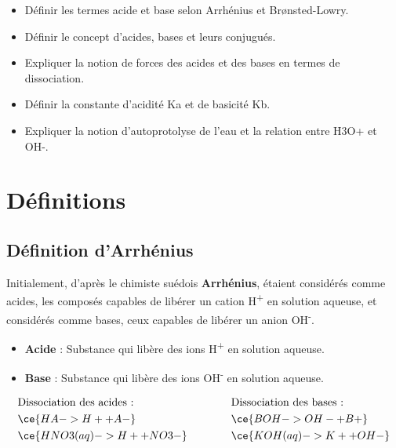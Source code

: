 \documentclass[
  11pt,
  a4paper,
  openany]{book}
\providecommand{\tightlist}{%
  \setlength{\itemsep}{0pt}\setlength{\parskip}{0pt}}
\begin{document}
\begin{objectives}

\begin{itemize}
\tightlist
\item
  Définir les termes acide et base selon Arrhénius et Brønsted-Lowry.
\item
  Définir le concept d'acides, bases et leurs conjugués.
\item
  Expliquer la notion de forces des acides et des bases en termes de dissociation.
\item
  Définir la constante d'acidité Ka et de basicité Kb.
\item
  Expliquer la notion d'autoprotolyse de l'eau et la relation entre \textbar H3O+\textbar{} et \textbar OH-\textbar.
\end{itemize}

\end{objectives}

\section{Définitions}\label{duxe9finitions-1}

\subsection{Définition d'Arrhénius}\label{duxe9finition-darrhuxe9nius}

Initialement, d'après le chimiste suédois \textbf{Arrhénius}, étaient considérés comme acides, les composés capables de libérer un cation H\textsuperscript{+} en solution aqueuse, et considérés comme bases, ceux capables de libérer un anion OH\textsuperscript{-}.

\begin{itemize}
\tightlist
\item
  \textbf{Acide} : Substance qui libère des ions H\textsuperscript{+} en solution aqueuse.
\item
  \textbf{Base} : Substance qui libère des ions OH\textsuperscript{-} en solution aqueuse.
\end{itemize}

\[
\begin{split}
& \text{Dissociation des acides :} \\
& \ce{HA -> H+ + A-} \\
& \ce{HNO3(aq) -> H+ + NO3-}
\end{split}
\qquad\qquad
\begin{split}
& \text{Dissociation des bases :} \\
& \ce{BOH -> OH- + B+} \\
& \ce{KOH(aq) -> K+ + OH-}
\end{split}
\]
\end{document}
